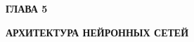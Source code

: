 \newpage
\begin{center}
	\textbf{\large ГЛАВА 5}

	\textbf{\large АРХИТЕКТУРА НЕЙРОННЫХ СЕТЕЙ}
\end{center}
